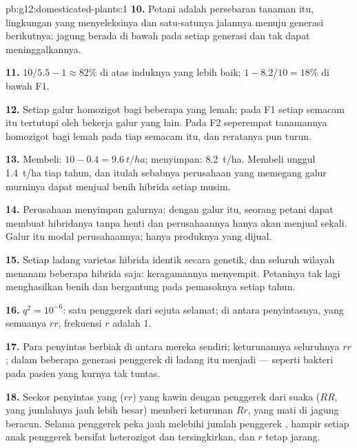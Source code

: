\begin{solution}{pb:g12:domesticated-plants:1}
\textbf{10.} Petani adalah persebaran tanaman itu, lingkungan yang
menyeleksinya dan satu-satunya jalannya menuju generasi berikutnya:
jagung berada di bawah  pada setiap generasi dan tak
dapat meninggalkannya.

\textbf{11.} $10/5.5 - 1 \approx 82\%$ di atas induknya yang lebih baik;
$1 - 8.2/10 = 18\%$ di bawah F1.

\textbf{12.} Setiap galur homozigot bagi beberapa   yang
lemah; pada F1 setiap  semacam itu tertutupi oleh  bekerja
galur yang lain. Pada F2 seperempat tanamannya homozigot bagi 
lemah pada tiap  semacam itu, dan reratanya pun turun.

\textbf{13.} Membeli: $10 - 0.4 = \qty{9.6}{t/ha}$; menyimpan: \qty{8.2}{t/ha}.
Membeli unggul \qty{1.4}{t/ha} tiap tahun, dan itulah sebabnya
perusahaan yang memegang galur murninya dapat menjual benih hibrida
setiap musim.

\textbf{14.} Perusahaan menyimpan galurnya; dengan galur itu, seorang
petani dapat membuat hibridanya tanpa henti dan perusahaannya hanya
akan menjual sekali. Galur itu modal perusahaannya; hanya produknya
yang dijual.

\textbf{15.} Setiap ladang varietas hibrida identik secara genetik, dan
seluruh wilayah menanam beberapa hibrida saja: keragamannya
menyempit. Petaninya tak lagi menghasilkan benih dan bergantung pada
pemasoknya setiap tahun.

\textbf{16.} $q^2 = 10^{-6}$: satu penggerek dari sejuta selamat; di
antara penyintasnya, yang semuanya $rr$, frekuensi $r$ adalah 1.

\textbf{17.} Para penyintas berbiak di antara mereka sendiri;
keturunannya seluruhnya $rr$; dalam beberapa generasi penggerek di
ladang itu menjadi  --- seperti bakteri pada pasien yang kurnya
tak tuntas.

\textbf{18.} Seekor penyintas yang  ($rr$) yang kawin dengan
penggerek dari suaka ($RR$, yang jumlahnya jauh lebih besar) memberi
keturunan $Rr$, yang mati di jagung beracun. Selama penggerek peka
jauh melebihi jumlah penggerek , hampir setiap anak penggerek
 bersifat heterozigot dan tersingkirkan, dan $r$ tetap jarang.


\end{solution}
